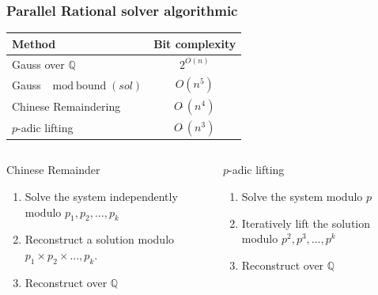 \documentclass{beamer}
\newcommand{\Q}{\ensuremath{\mathbb{Q}\xspace}}
\newcommand{\GO}[1]{\ensuremath{O(#1)}\xspace}
\newcommand{\SO}[1]{\ensuremath{O\tilde\ (#1)}\xspace}
\begin{document}
\begin{frame}
  \frametitle{Parallel Rational solver algorithmic}
  \begin{center}
    \begin{tabular}{lc}
  \toprule
  Method  & Bit complexity \\
  \midrule
  Gauss over $\mathbb{Q}$ & $2^{\GO{n}}$ \\
  Gauss $\mod \text{bound}(sol)$ & $\GO{n^5}$\\
  Chinese Remaindering %
  & $\SO{n^4}
  $\\
  $p$-adic lifting & $\SO{n^3}$\\
  \bottomrule
\end{tabular}
  \end{center}

  \begin{columns}
    \begin{column}{.48\textwidth}
      \begin{block}  {Chinese Remainder}
        \begin{enumerate}
        \item Solve the system independently modulo $p_1,p_2,\dots,p_k$
        \item Reconstruct a solution modulo $p_1\times p_2\times \dots,p_k$.
        \item Reconstruct over $\Q$
        \end{enumerate}
      \end{block}
    \end{column}
    \begin{column}{.48\textwidth}
      \begin{block} {$p$-adic lifting}
        \begin{enumerate}
        \item Solve the system modulo $p$
        \item Iteratively lift the solution modulo $p^2,p^3,\dots,p^k$
        \item Reconstruct over $\Q$
        \end{enumerate}
      \end{block}
    \end{column}
  \end{columns}
\end{frame}
\end{document}
